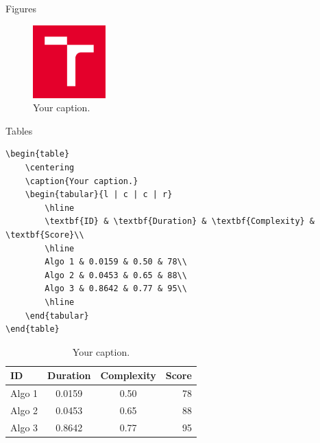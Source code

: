 \documentclass[aspectratio=1610]{beamer}
\begin{document}
\begin{frame}{Figures}
    \begin{figure}
        \centering
        \includegraphics[width=0.25\textwidth]{Images/logo/logo_symbol.png}
        \caption{Your caption.}
    \end{figure}
\end{frame}


\begin{frame}[fragile]{Tables}
    \lstset{language=[LaTeX]TeX}
\begin{lstlisting}
\begin{table}
    \centering
    \caption{Your caption.}
    \begin{tabular}{l | c | c | r}
        \hline
        \textbf{ID} & \textbf{Duration} & \textbf{Complexity} & \textbf{Score}\\
        \hline
        Algo 1 & 0.0159 & 0.50 & 78\\
        Algo 2 & 0.0453 & 0.65 & 88\\
        Algo 3 & 0.8642 & 0.77 & 95\\
        \hline
    \end{tabular}
\end{table}
\end{lstlisting}
    \begin{table}
        \centering
        \caption{Your caption.}
        \begin{tabular}{l | c | c | r}
            \hline
            \textbf{ID} & \textbf{Duration} & \textbf{Complexity} & \textbf{Score}\\
            \hline
            Algo 1 & 0.0159 & 0.50 & 78\\
            Algo 2 & 0.0453 & 0.65 & 88\\
            Algo 3 & 0.8642 & 0.77 & 95\\
            \hline
        \end{tabular}
    \end{table}
\end{frame}
\end{document}
